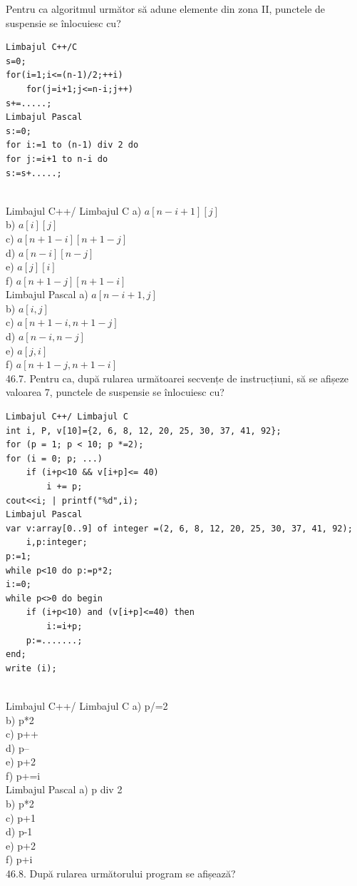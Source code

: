 \begin{itemize}
\begin{enumerate}
Pentru ca algoritmul următor să adune elemente din zona II, punctele de suspensie se înlocuiesc cu?
\begin{verbatim}
Limbajul C++/C
s=0;
for(i=1;i<=(n-1)/2;++i)
    for(j=i+1;j<=n-i;j++)
s+=.....;
Limbajul Pascal
s:=0;
for i:=1 to (n-1) div 2 do
for j:=i+1 to n-i do
s:=s+.....;
\end{verbatim}
\\
Limbajul C++/ Limbajul C
a) $a[n-i+1][j]$
\\
b) $a[i][j]$
\\
c) $a[n+1-i][n+1-j]$
\\
d) $a[n-i][n-j]$
\\
e) $a[j][i]$
\\
f) $a[n+1-j][n+1-i]$
\\
Limbajul Pascal
a) $a[n-i+1, j]$
\\
b) $a[i, j]$
\\
c) $a[n+1-i, n+1-j]$
\\
d) $a[n-i, n-j]$
\\
e) $a[j, i]$
\\
f) $a[n+1-j, n+1-i]$
\\
46.7. Pentru ca, după rularea următoarei secvențe de instrucțiuni, să se afișeze valoarea 7, punctele de suspensie se înlocuiesc cu?
\begin{verbatim}
Limbajul C++/ Limbajul C
int i, P, v[10]={2, 6, 8, 12, 20, 25, 30, 37, 41, 92};
for (p = 1; p < 10; p *=2);
for (i = 0; p; ...)
    if (i+p<10 && v[i+p]<= 40)
        i += p;
cout<<i; | printf("%d",i);
Limbajul Pascal
var v:array[0..9] of integer =(2, 6, 8, 12, 20, 25, 30, 37, 41, 92);
    i,p:integer;
p:=1;
while p<10 do p:=p*2;
i:=0;
while p<>0 do begin 
    if (i+p<10) and (v[i+p]<=40) then
        i:=i+p;
    p:=.......;
end;
write (i);
\end{verbatim}
\\
Limbajul C++/ Limbajul C
a) p/=2
\\
b) p*2
\\
c) p++
\\
d) p--
\\
e) p+2
\\
f) p+=i
\\
Limbajul Pascal
a) p div 2
\\
b) p*2
\\
c) p+1
\\
d) p-1
\\
e) p+2
\\
f) p+i
\\
46.8. După rularea următorului program se afișează?

\end{enumerate}
\end{itemize}
